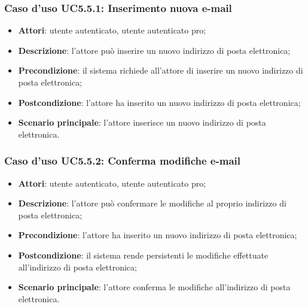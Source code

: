 \subsubsection{Caso d'uso UC5.5.1: Inserimento nuova e-mail}

\begin{itemize}
	\item \textbf{Attori}: utente autenticato, utente autenticato pro;
	\item \textbf{Descrizione}: l'attore può inserire un nuovo indirizzo di posta elettronica;
	\item \textbf{Precondizione}: il sistema richiede all'attore di inserire un nuovo indirizzo di posta elettronica;
	\item \textbf{Postcondizione}: l'attore ha inserito un nuovo indirizzo di posta elettronica;
	\item \textbf{Scenario principale}: l'attore inserisce un nuovo indirizzo di posta elettronica.
\end{itemize}

\subsubsection{Caso d'uso UC5.5.2: Conferma modifiche e-mail}

\begin{itemize}
	\item \textbf{Attori}: utente autenticato, utente autenticato pro;
	\item \textbf{Descrizione}: l'attore può confermare le modifiche al proprio indirizzo di posta elettronica;
	\item \textbf{Precondizione}: l'attore ha inserito un nuovo indirizzo di posta elettronica;
	\item \textbf{Postcondizione}: il sistema rende persistenti le modifiche effettuate all'indirizzo di posta elettronica;
	\item \textbf{Scenario principale}: l'attore conferma le modifiche all'indirizzo di posta elettronica.
\end{itemize}


